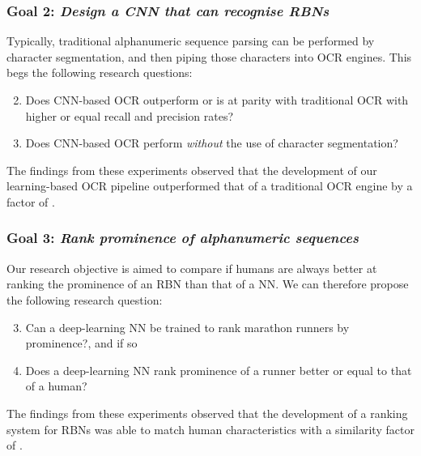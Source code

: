 \subsubsection*{Goal 2: \itshape Design a CNN that can recognise RBNs}

Typically, traditional alphanumeric sequence parsing can be performed by character segmentation, and then piping those characters into OCR engines.
This begs the following research questions:
\begin{enumerate}[label=\bfseries~RQ\arabic*), leftmargin=2cm, rightmargin=1.5cm]
  \setcounter{enumi}{1}
  \item\label{rq:2} Does CNN-based OCR outperform or is at parity with traditional OCR with higher or equal recall and precision rates?
  \item\label{rq:3} Does CNN-based OCR perform \textit{without} the use of character segmentation?
\end{enumerate}
The findings from these experiments observed that the development of our learning-based OCR pipeline outperformed that of a traditional OCR engine by a factor of .

\subsubsection*{Goal 3: \itshape Rank prominence of alphanumeric sequences}

Our research objective is aimed to compare if humans are always better at ranking the prominence of an RBN than that of a NN.
We can therefore propose the following research question:
\begin{enumerate}[label=\bfseries~RQ\arabic*), leftmargin=2cm, rightmargin=1.5cm]
  \setcounter{enumi}{2}
  \item\label{rq:4} Can a deep-learning NN be trained to rank marathon runners by prominence?, and if so
  \item\label{rq:5} Does a deep-learning NN rank prominence of a runner better or equal to that of a human?
\end{enumerate}
The findings from these experiments observed that the development of a ranking system for RBNs was able to match human characteristics with a similarity factor of .

